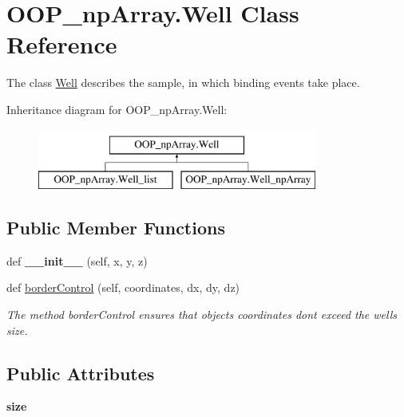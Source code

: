 \hypertarget{class_o_o_p__np_array_1_1_well}{}\section{O\+O\+P\+\_\+np\+Array.\+Well Class Reference}
\label{class_o_o_p__np_array_1_1_well}


The class \mbox{\hyperlink{class_o_o_p__np_array_1_1_well}{Well}} describes the sample, in which binding events take place.  


Inheritance diagram for O\+O\+P\+\_\+np\+Array.\+Well\+:\begin{figure}[H]
\begin{center}
\leavevmode
\includegraphics[height=2.000000cm]{class_o_o_p__np_array_1_1_well}
\end{center}
\end{figure}
\subsection*{Public Member Functions}
\begin{DoxyCompactItemize}
\item 
\mbox{\label{class_o_o_p__np_array_1_1_well_ab7cb865616e6fd3e6e98604400329f0c}} 
def {\bfseries \+\_\+\+\_\+init\+\_\+\+\_\+} (self, x, y, z)
\item 
def \mbox{\hyperlink{class_o_o_p__np_array_1_1_well_a8991b9d19614962be6a088031f780554}{border\+Control}} (self, coordinates, dx, dy, dz)
\begin{DoxyCompactList}\small\item\em The method border\+Control ensures that objects\textquotesingle{} coordinates don\textquotesingle{}t exceed the well\textquotesingle{}s size. \end{DoxyCompactList}\end{DoxyCompactItemize}
\subsection*{Public Attributes}
\begin{DoxyCompactItemize}
\item 
\mbox{\label{class_o_o_p__np_array_1_1_well_a7ef6da8f1d375133df8edff40ef3d48d}} 
{\bfseries size}
\end{DoxyCompactItemize}


